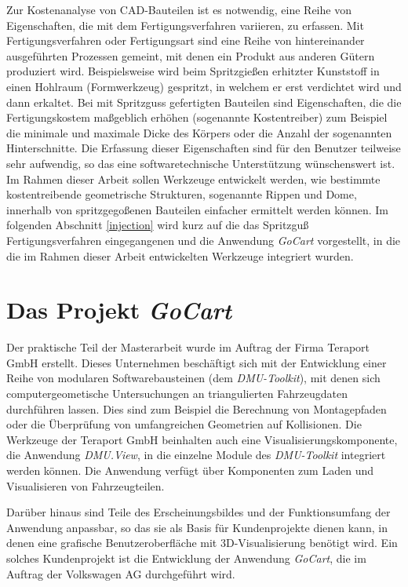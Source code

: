 Zur Kostenanalyse von CAD-Bauteilen ist es notwendig, eine Reihe von Eigenschaften, die mit dem Fertigungsverfahren variieren, zu erfassen. Mit Fertigungsverfahren oder Fertigungsart sind eine Reihe von hintereinander ausgef\"uhrten Prozessen gemeint, mit denen ein Produkt aus anderen G\"utern produziert wird. Beispielsweise wird beim Spritzgie{\ss}en erhitzter Kunststoff in einen Hohlraum (Formwerkzeug) gespritzt, in welchem er erst verdichtet wird und dann erkaltet. Bei mit Spritzguss gefertigten Bauteilen sind Eigenschaften, die die Fertigungskostem ma{\ss}geblich erh\"ohen (sogenannte Kostentreiber) zum Beispiel die minimale und maximale Dicke des K\"orpers oder die Anzahl der sogenannten Hinterschnitte. Die Erfassung dieser Eigenschaften sind f\"ur den Benutzer teilweise sehr aufwendig, so das eine softwaretechnische Unterst\"utzung w\"unschenswert ist. Im Rahmen dieser Arbeit sollen Werkzeuge entwickelt werden, wie bestimmte kostentreibende geometrische Strukturen, sogenannte Rippen und Dome, innerhalb von spritzgego{\ss}enen Bauteilen einfacher ermittelt werden k\"onnen. Im folgenden Abschnitt \ref{injection} wird kurz auf die das Spritzgu{\ss} Fertigungsverfahren eingegangenen und die Anwendung \textit{GoCart} vorgestellt, in die die im Rahmen dieser Arbeit entwickelten Werkzeuge integriert wurden.

\section{Das Projekt \textit{GoCart}}
\label{goCart}

Der praktische Teil der Masterarbeit wurde im Auftrag der Firma Teraport GmbH erstellt. Dieses Unternehmen besch\"aftigt sich mit der Entwicklung einer Reihe von modularen Softwarebausteinen (dem \textit{DMU-Toolkit}), mit denen sich computergeometische Untersuchungen an triangulierten Fahrzeugdaten durchf\"uhren lassen. Dies sind zum Beispiel die Berechnung von Montagepfaden oder die \"Uberpr\"ufung von umfangreichen Geometrien auf Kollisionen. Die Werkzeuge der Teraport GmbH beinhalten auch eine Visualisierungskomponente, die Anwendung \textit{DMU.View}, in die einzelne Module des \textit{DMU-Toolkit} integriert werden k\"onnen. Die Anwendung verf\"ugt \"uber Komponenten zum Laden und Visualisieren von Fahrzeugteilen.  

Dar\"uber hinaus sind Teile des Erscheinungsbildes und der Funktionsumfang der Anwendung anpassbar, so das sie als Basis f\"ur Kundenprojekte dienen kann, in denen eine grafische Benutzeroberfl\"ache mit 3D-Visualisierung ben\"otigt wird. Ein solches Kundenprojekt ist die Entwicklung der Anwendung \textit{GoCart}, die im Auftrag der Volkswagen AG durchgeführt wird.

